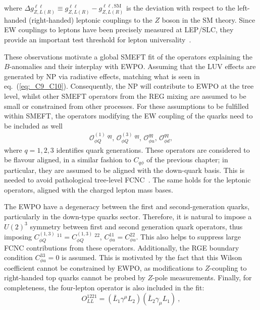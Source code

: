 where $\Delta g_{Z,L (R)}^{\ell\ell} \equiv g_{Z,L(R)}^{\ell\ell} - g_{Z,L (R)}^{\ell\ell,\textrm{SM}}$ is the deviation with respect to the left-handed (right-handed) leptonic couplings to the $Z$ boson in the SM theory. Since EW couplings to leptons have been precisely measured at LEP/SLC, they provide an important test threshold for lepton universality~\cite{Efrati:2015eaa,deBlas:2016ojx}.
\par These observations motivate a global SMEFT fit of the operators explaining the  $B$-anomalies and their interplay with EWPO.  Assuming that the LUV effects are generated by NP via radiative effects, matching what is seen in eq.~(\ref{eq:_C9_C10}). Consequently, the NP will contribute to EWPO at the tree level, whilst other SMEFT operators from the REG mixing are assumed to be small or constrained from other processes.  For these assumptions to be fulfilled within SMEFT, the operators modifying the EW coupling of the quarks need to be included as well 
\begin{eqnarray} 
	\label{eq:SMEFT_op_HQ}
	\mathcal{O}_{\phi Q}^{(1)} \ ^{qq} , \,
	\mathcal{O}_{\phi Q}^{(3)}\ ^{qq} ,\,  
	\mathcal{O}_{\phi u}^{qq}, \, 
	\mathcal{O}_{\phi d}^{qq}, 
\end{eqnarray}
where $q=1,2,3$ identifies quark generations. These operators are considered to be flavour aligned, in a similar fashion to $C_{q\phi}$ of the previous chapter; in particular, they are assumed to be aligned with the down-quark basis. This is needed to avoid pathological tree-level FCNC~\cite{Silvestrini:2018dos}. The same holds for the leptonic operators, aligned with the charged lepton mass bases.
%
\par The EWPO have a degeneracy between the first and second-generation quarks, particularly in the down-type quarks sector. Therefore, it is natural to impose a $U(2)^3$ symmetry between first and second generation quark operators, thus imposing $C_{\phi Q}^{(1,3)}\ ^{11} = C_{\phi Q}^{(1,3)}\ ^{22} $, $C_{\phi u}^{11} = C_{\phi u}^{22}$. This also helps to suppress large FCNC contributions from these operators.  Additionally, the RGE boundary condition $C^{33}_{\phi u}=0$ is assumed. This is motivated by the fact that this Wilson coefficient cannot be constrained by EWPO, as modifications to $Z$-coupling to right-handed top quarks cannot be probed by $Z$-pole measurements. 
Finally, for completeness, the four-lepton operator is also included in the fit:
\begin{equation}
	\label{eq:SMEFT_op_LLLL}
	O^{1221}_{LL}=(\bar{L}_1 \gamma^\mu L_2) (\bar{L}_2 \gamma_\mu L_1) \ ,
\end{equation}

